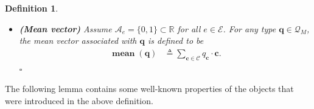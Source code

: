 \documentclass[journal, twocolumn]{IEEEtran}
\renewcommand{\mathbf}[1]{{\bm{#1}}}
\newcommand{\R}{\mathbb{R}}
\newcommand{\vect}[1]{\mathbf{#1}}
\newcommand{\code}[1]{\mathcal{#1}}
\newcommand{\set}[1]{\mathcal{#1}}
\newcommand{\defeq}{\triangleq}
\newcommand{\codeCedge}{\code{C}}
\newcommand{\setA}{\set{A}}
\newcommand{\setE}{\set{E}}
\newcommand{\vc}{\vect{c}}
\newcommand{\vq}{\vect{q}}
\newcommand{\?}{\mathrm{?}}
\newcommand{\meanvect}{\operatorname{\mathbf{mean}}}
\newcommand{\setQsample}[1]{\set{Q}_{#1}}
\newcommand{\qedwhite}{\hspace*{\fill}%
  $\square$\smallskip}
\newcommand{\defend}{\qedwhite}
\newtheorem{Definition}[Lemma]{Definition}
\begin{document}
\begin{Definition}
\begin{itemize}
  \item \textbf{(Mean vector)} Assume $\setA_e = \{ 0, 1 \} \subset \R$ for
    all $e \in \setE$. For any type $\vq \in \setQsample{M}$, the mean vector
    associated with $\vq$ is defined to be
    \begin{align*}
      \meanvect(\vq)
        &\defeq
           \sum_{\vc \in \codeCedge}
             q_{\vc}
             \cdot
             \vc.
    \end{align*}
    \vskip-0.25cm
    \defend
  
  \end{itemize}
\end{Definition}


The following lemma contains some well-known properties of the objects that
were introduced in the above definition.
\end{document}
